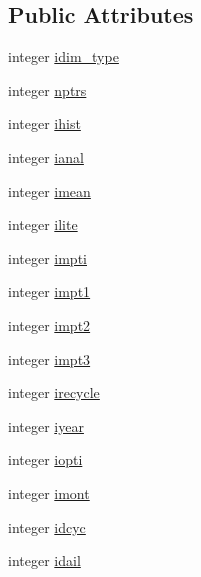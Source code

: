 \subsection*{Public Attributes}
\begin{DoxyCompactItemize}
\item 
integer \hyperlink{structed__var__tables_1_1var__table_a40392ffff9003585758556c63a5cb22b}{idim\+\_\+type}
\item 
integer \hyperlink{structed__var__tables_1_1var__table_aad35a5485013e53083f97152d96dba2e}{nptrs}
\item 
integer \hyperlink{structed__var__tables_1_1var__table_a5a99916b1e9adea819227a8f89c77e21}{ihist}
\item 
integer \hyperlink{structed__var__tables_1_1var__table_a312ab422b41cea5db01740c068855330}{ianal}
\item 
integer \hyperlink{structed__var__tables_1_1var__table_a1d8fc54f52e79fb5ecba83cfe5035e4c}{imean}
\item 
integer \hyperlink{structed__var__tables_1_1var__table_a9d08b584471f1ff38d27bf7d60ce6806}{ilite}
\item 
integer \hyperlink{structed__var__tables_1_1var__table_a2fdbdb8888f5cc28ec6c1e1236df791d}{impti}
\item 
integer \hyperlink{structed__var__tables_1_1var__table_a47306c6f73ddece604ee757da7cf8a78}{impt1}
\item 
integer \hyperlink{structed__var__tables_1_1var__table_a2a6affd323bee730e895ed6d904abcbf}{impt2}
\item 
integer \hyperlink{structed__var__tables_1_1var__table_af6b1037c1388a01e33505c3e4621656a}{impt3}
\item 
integer \hyperlink{structed__var__tables_1_1var__table_a871878772d64d6e1cafd0b13c7bbfe00}{irecycle}
\item 
integer \hyperlink{structed__var__tables_1_1var__table_ada8cfa52f111da1d37bab7d44ba373d6}{iyear}
\item 
integer \hyperlink{structed__var__tables_1_1var__table_ab6cd87da7a95cd4f844b4abd2ffd9cc1}{iopti}
\item 
integer \hyperlink{structed__var__tables_1_1var__table_a21ff1fc0547a800031fa4b3e31c5db7d}{imont}
\item 
integer \hyperlink{structed__var__tables_1_1var__table_abeda4192319cfa7b3dc1f568e2662619}{idcyc}
\item 
integer \hyperlink{structed__var__tables_1_1var__table_a0600fa99d231f89ced60c97497073106}{idail}
\item 

\end{DoxyCompactItemize}
